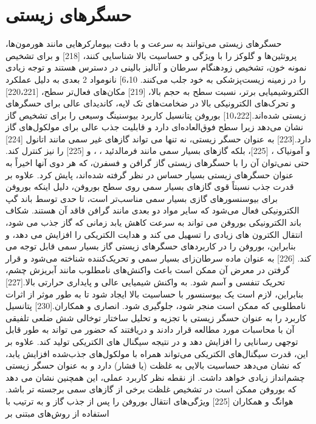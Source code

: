 \section{حسگرهای زیستی}
حسگرهای زیستی می‌توانند به سرعت و با دقت بیومارکرهایی مانند هورمون‌ها، پروتئین‌ها و گلوکز را با ویژگی و حساسیت بالا شناسایی کنند، \cite{taoEmergingTwodimensionalMonoelemental2019}[218] و برای تشخیص نمونه خون، تشخیص زودهنگام سرطان و آنالیز بالینی در دسترس هستند و توجه زیادی را در زمینه زیست‌پزشکی به خود جلب می‌کنند. 6،10] نانومواد 2 بعدی به دلیل عملکرد الکتروشیمیایی برتر، نسبت سطح به حجم بالا،\cite{huangAdsorptionGasMolecules2018} [219] مکان‌های فعال‌تر سطح، \cite{ranjanBoropheneNewSensation2020, li2DBoronSheets2020}[220،221] و تحرک‌های الکترونیکی بالا در ضخامت‌های تک لایه، کاندیدای عالی برای حسگرهای زیستی شده‌اند.\cite{liRatiometricImmunoassaysBuilt2019, ranjanBoropheneNewSensation2020}[10،222] بوروفن پتانسیل کاربرد بیوسنینگ وسیعی را برای تشخیص گاز نشان می‌دهد زیرا سطح فوق‌العاده‌ای دارد و قابلیت جذب عالی برای مولکول‌های گاز دارد.\cite{li2DBoronSheets2020}[223] به عنوان حسگر زیستی، نه تنها می تواند گازهای غیر سمی مانند اتانول  \cite{xieTwoDimensionalBoropheneProperties2020}[224] و آمونیاک ، \cite{huangAdsorptionGasMolecules2018}[225]، بلکه گازهای بسیار سمی مانند فرمالدئید ، ، و  \cite{huangAdsorptionGasMolecules2018}[225] را نیز کنترل کند. حتی نمی‌توان آن را با حسگرهای زیستی گاز گرافن و فسفرن، که هر دوی آنها اخیراً به عنوان حسگرهای زیستی بسیار حساس در نظر گرفته شده‌اند، پایش کرد. علاوه بر قدرت جذب نسبتاً قوی گازهای بسیار سمی روی سطح بوروفن، دلیل اینکه بوروفن برای بیوسنسورهای گازی بسیار سمی مناسب‌تر است، تا حدی توسط باند گپ الکترونیکی فعال می‌شود که سایر مواد دو بعدی مانند گرافن فاقد آن هستند. شکاف باند الکترونیکی بوروفن می تواند به سرعت کاهش یابد زمانی که گاز جذب می شود، انتقال الکترون های زیادی را تسهیل می کند و هدایت الکتریکی را افزایش می دهد، و بنابراین، بوروفن را در کاربردهای حسگرهای زیستی گاز بسیار سمی قابل توجه می کند. \cite{shuklaRealization2DBorophene2017}[226]  به عنوان ماده سرطان‌زای بسیار سمی و تحریک‌کننده شناخته می‌شود و قرار گرفتن در معرض آن ممکن است باعث واکنش‌های نامطلوب مانند آبریزش چشم، تحریک تنفسی و آسم شود. به واکنش شیمیایی عالی و پایداری حرارتی بالا.\cite{cockcroftOCCUPATIONALASTHMACAUSED1982}[227] بنابراین، لازم است یک بیوسنسور  با حساسیت بالا ایجاد شود تا به طور موثر از اثرات نامطلوبی که  ممکن است منجر شود، جلوگیری شود. انصاری و همکاران.\cite{kootenaeiB36BoropheneElectronic2016}[230] پتانسیل کاربرد  را به عنوان حسگر زیستی  با تجزیه و تحلیل ساختار توخالی شش ضلعی تلفیقی آن با محاسبات  مورد مطالعه قرار دادند و دریافتند که حضور  می تواند به طور قابل توجهی رسانایی  را افزایش دهد و در نتیجه سیگنال های الکتریکی تولید کند. علاوه بر این، قدرت سیگنال‌های الکتریکی می‌تواند همراه با مولکول‌های جذب‌شده  افزایش یابد، که نشان می‌دهد  حساسیت بالایی به غلظت (یا فشار)  دارد و به عنوان حسگر زیستی  چشم‌انداز زیادی خواهد داشت. از نقطه نظر کاربرد عملی، این همچنین نشان می دهد که بوروفن ممکن است در تشخیص غلظت برخی از گازهای سمی برجسته تر باشد. هوانگ و همکاران \cite{huangAdsorptionGasMolecules2018}[225] ویژگی‌های انتقال بوروفن را پس از جذب گاز  و  به ترتیب با استفاده از روش‌های مبتنی بر 